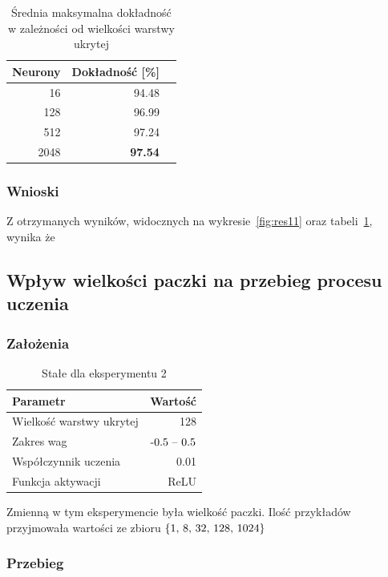 \documentclass{article}
\begin{document}
\begin{table}[H]
	\caption{Średnia maksymalna dokładność w zależności od wielkości warstwy ukrytej}
	\label{tabela-res-11}
	\centering
	\begin{tabular}{rrr}
		\toprule
		Neurony & Dokładność [\%] \\
		\midrule
		16      & 94.48              \\
		128     & 96.99              \\
		512     & 97.24              \\
		2048    & \textbf{97.54}     \\
		\bottomrule
	\end{tabular}
\end{table}

\subsubsection*{Wnioski}

Z otrzymanych wyników, widocznych na wykresie~\ref{fig:res11} oraz tabeli~\ref{tabela-res-11}, wynika że

\newpage
\subsection{Wpływ wielkości paczki na przebieg procesu uczenia}
\subsubsection*{Założenia}
\begin{table}[H]
	\caption{Stałe dla eksperymentu 2}
	\label{tabela-const-2}
	\centering
	\begin{tabular}{lr}
		\toprule
		Parametr                   & Wartość         \\
		\midrule
		Wielkość warstwy ukrytej & 128               \\
		Zakres wag                 & \($-0.5 -- 0.5$\) \\
		Współczynnik uczenia     & 0.01              \\
		Funkcja aktywacji          & ReLU              \\
		\bottomrule
	\end{tabular}
\end{table}

Zmienną w tym eksperymencie była wielkość paczki. Ilość przykładów przyjmowała wartości ze zbioru \(\{$1, 8, 32, 128, 1024$\}\)
\subsubsection*{Przebieg}
\end{document}
